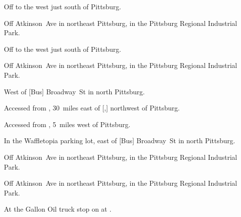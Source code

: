 
\begin{LocationList}

Off  to the west just south of Pittsburg.

Off Atkinson~Ave in northeast Pittsburg, in the Pittsburg Regional Industrial Park.

Off  to the west just south of Pittsburg.

Off Atkinson~Ave in northeast Pittsburg, in the Pittsburg Regional Industrial Park.

West of [Bus] Broadway~St in north Pittsburg.

Accessed from , 30~miles east of [,] northwest of Pittsburg.

Accessed from , 5~miles west of Pittsburg.

In the Waffletopia parking lot, east of [Bus] Broadway~St in north Pittsburg.

Off Atkinson~Ave in northeast Pittsburg, in the Pittsburg Regional Industrial Park.

\Location{\TruckService \Service}
Off Atkinson~Ave in northeast Pittsburg, in the Pittsburg Regional Industrial Park.

At the Gallon Oil truck stop on  at  .

\end{LocationList}

